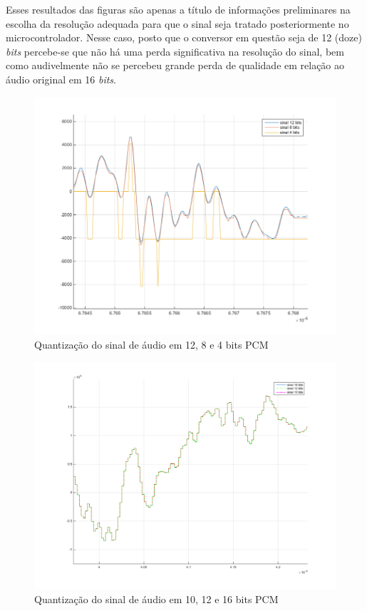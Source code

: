 		
		Esses resultados das figuras  são apenas a título de informações preliminares na escolha da resolução adequada para que o sinal seja tratado posteriormente no microcontrolador. Nesse caso, posto que o conversor em questão seja de 12 (doze) \textit{bits} percebe-se que não há uma perda significativa na resolução do sinal, bem como audivelmente não se percebeu grande perda de qualidade em relação ao áudio original em 16 \textit{bits}.
		
		\begin{figure}[!ht]
			\label{fig-exp2}
			\centering
			\includegraphics[scale=0.5]{./figuras/simulacoes/resolucao-audios/12-8-4-normal.png}
			\caption{Quantização do sinal de áudio em 12, 8 e 4 bits PCM}
		\end{figure}
		
		\begin{figure}[!ht]
			\label{fig-exp1}
			\centering
			\includegraphics[scale=0.5]{./figuras/simulacoes/resolucao-audios/10-12-16-normal.png}
			\caption{Quantização do sinal de áudio em 10, 12 e 16 bits PCM}
		\end{figure}
	
